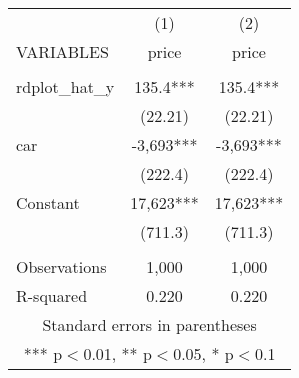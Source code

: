 \documentclass[]{article}
\begin{document}
\begin{tabular}{lcc} \hline
 & (1) & (2) \\
VARIABLES & price & price \\ \hline
 &  &  \\
rdplot\_hat\_y & 135.4*** & 135.4*** \\
 & (22.21) & (22.21) \\
car & -3,693*** & -3,693*** \\
 & (222.4) & (222.4) \\
Constant & 17,623*** & 17,623*** \\
 & (711.3) & (711.3) \\
 &  &  \\
Observations & 1,000 & 1,000 \\
 R-squared & 0.220 & 0.220 \\ \hline
\multicolumn{3}{c}{ Standard errors in parentheses} \\
\multicolumn{3}{c}{ *** p$<$0.01, ** p$<$0.05, * p$<$0.1} \\
\end{tabular}
\end{document}
